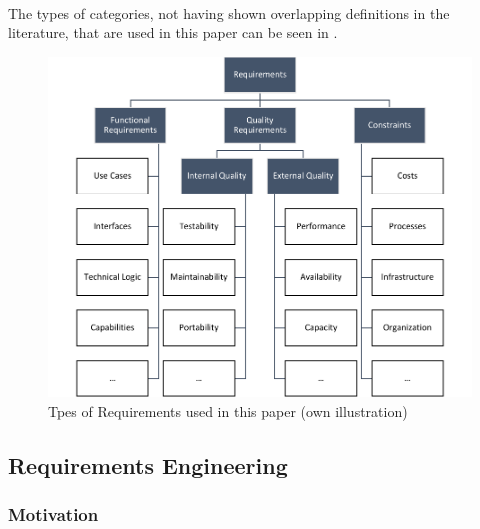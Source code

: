 \paragraph{} The types of categories, not having shown overlapping definitions in the literature, that are used in this paper can be seen in .

\begin{figure}[H]
    \centering
    \includegraphics[scale=1]{img/RequirementTypes.pdf}
    \caption[Requirement Types]{Tpes of Requirements used in this paper (own illustration)}
    \label{fig:reqTypes}
\end{figure}
\subsection{Requirements Engineering}
\subsubsection{Motivation}
 
 
